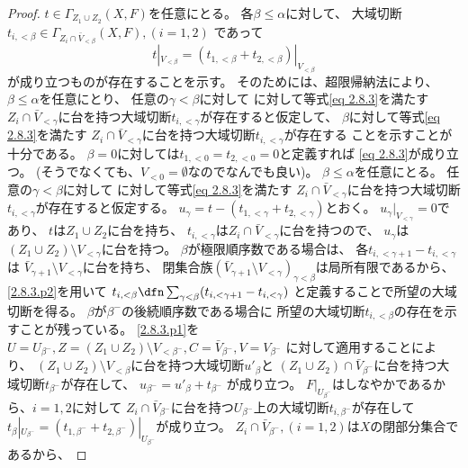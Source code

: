 \documentclass[uplatex,dvipdfmx]{jsarticle}
\begin{document}
\begin{proof}
  \(t\in \Gamma_{Z_1\cup Z_2}(X,F)\)を任意にとる。
  各\(\beta \leq \alpha\)に対して、
  大域切断
  \(t_{i,<\beta}\in \Gamma_{Z_i\cap \bar{V}_{<\beta}}(X,F),(i=1,2)\)
  であって
  \begin{equation}
    \label{eq 2.8.3}
    t|_{V_{<\beta}}=(t_{1,<\beta}+t_{2,<\beta})|_{V_{<\beta}}
    \tag{\(\bigstar\)}
  \end{equation}
  が成り立つものが存在することを示す。
  そのためには、超限帰納法により、\(\beta \leq \alpha\)を任意にとり、
  任意の\(\gamma<\beta\)に対して
  に対して等式\eqref{eq 2.8.3}を満たす
  \(Z_i\cap \bar{V}_{<\gamma}\)に台を持つ大域切断\(t_{i,<\gamma}\)が存在すると仮定して、
  \(\beta\)に対して等式\eqref{eq 2.8.3}を満たす
  \(Z_i\cap \bar{V}_{<\gamma}\)に台を持つ大域切断\(t_{i,<\gamma}\)が存在する
  ことを示すことが十分である。
  \(\beta = 0\)に対しては\(t_{1,<0} = t_{2,<0} = 0\)と定義すれば
  \eqref{eq 2.8.3}が成り立つ。
  (そうでなくても、\(V_{<0}=\emptyset\)なのでなんでも良い)。
  \(\beta \leq \alpha\)を任意にとる。
  任意の\(\gamma<\beta\)に対して
  に対して等式\eqref{eq 2.8.3}を満たす
  \(Z_i\cap \bar{V}_{<\gamma}\)に台を持つ大域切断\(t_{i,<\gamma}\)が存在すると仮定する。
  \(u_{\gamma} = t-(t_{1,<\gamma}+t_{2,<\gamma})\)とおく。
  \(u_{\gamma}|_{V_{<\gamma}} = 0\)であり、
  \(t\)は\(Z_1\cup Z_2\)に台を持ち、
  \(t_{i,<\gamma}\)は\(Z_i\cap \bar{V}_{<\gamma}\)に台を持つので、
  \(u_{\gamma}\)は\((Z_1\cup Z_2)\setminus V_{<\gamma}\)に台を持つ。
  \(\beta\)が極限順序数である場合は、
  各\(t_{i,<\gamma+1}-t_{i,<\gamma}\)は
  \(\bar{V}_{\gamma+1}\setminus V_{<\gamma}\)に台を持ち、
  閉集合族\((\bar{V}_{\gamma+1}\setminus V_{<\gamma})_{\gamma<\beta}\)は局所有限であるから、
  \ref{2.8.3.p2}を用いて
  \(t_{i,<\beta} \dfn \sum_{\gamma<\beta}(t_{i,<\gamma+1}-t_{i,<\gamma})\)
  と定義することで所望の大域切断を得る。
  \(\beta\)が\(\beta^-\)の後続順序数である場合に
  所望の大域切断\(t_{i,<\beta}\)の存在を示すことが残っている。
  \ref{2.8.3.p1}を
  \(U=U_{\beta^-}, Z=(Z_1\cup Z_2)\setminus V_{<\beta^-},
  C=\bar{V}_{\beta^-}, V=V_{\beta^-}\)
  に対して適用することにより、
  \((Z_1\cup Z_2)\setminus V_{<\beta}\)に台を持つ大域切断\(u'_{\beta}\)と
  \((Z_1\cup Z_2)\cap \bar{V}_{\beta^-}\)に台を持つ大域切断\(t_{\beta^-}\)が存在して、
  \(u_{\beta^-} = u'_{\beta} + t_{\beta^-}\)
  が成り立つ。
  \(F|_{U_{\beta^-}}\)はしなやかであるから、\(i=1,2\)に対して
  \(Z_i\cap \bar{V}_{\beta^-}\)に台を持つ\(U_{\beta^-}\)上の大域切断\(t_{i,\beta^-}\)が存在して
  \(t_{\beta}|_{U_{\beta^-}} = (t_{1,\beta^-}+t_{2,\beta^-})|_{U_{\beta^-}}\)が成り立つ。
  \(Z_i\cap \bar{V}_{\beta^-}, (i=1,2)\)は\(X\)の閉部分集合であるから、

\end{proof}
\end{document}
